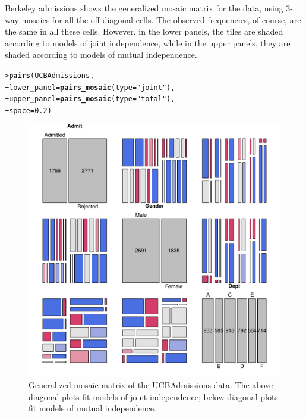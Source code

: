 \documentclass[10pt,krantz2]{krantz}\usepackage[]{graphicx}\usepackage[]{color}
\makeatletter
\newcommand{\hlnum}[1]{\textcolor[rgb]{0.686,0.059,0.569}{#1}}%
\newcommand{\hlstr}[1]{\textcolor[rgb]{0.192,0.494,0.8}{#1}}%
\newcommand{\hlstd}[1]{\textcolor[rgb]{0.345,0.345,0.345}{#1}}%
\newcommand{\hlkwc}[1]{\textcolor[rgb]{0.333,0.667,0.333}{#1}}%
\newcommand{\hlkwd}[1]{\textcolor[rgb]{0.737,0.353,0.396}{\textbf{#1}}}%
\newenvironment{kframe}{%
 \def\at@end@of@kframe{}%
 \ifinner\ifhmode%
  \def\at@end@of@kframe{\end{minipage}}%
  \begin{minipage}{\columnwidth}%
 \fi\fi%
 \def\FrameCommand##1{\hskip\@totalleftmargin \hskip-\fboxsep
 \colorbox{shadecolor}{##1}\hskip-\fboxsep
     \hskip-\linewidth \hskip-\@totalleftmargin \hskip\columnwidth}%
 \MakeFramed {\advance\hsize-\width
   \@totalleftmargin\z@ \linewidth\hsize
   \@setminipage}}%
 {\par\unskip\endMakeFramed%
 \at@end@of@kframe}
\newenvironment{knitrout}{}{} %
\renewenvironment{knitrout}{\small\renewcommand{\baselinestretch}{.85}}{} %
\makeatother
\begin{document}
\begin{Example}[berkeley4b]{Berkeley admissions}
 shows the generalized mosaic matrix for the 
data, using 3-way mosaics for all the off-diagonal cells.
The observed frequencies, of course, are the same in all these cells.
However, in the lower panels, the tiles are shaded according to models of
joint independence, while in the upper panels, they are shaded according to
models of mutual independence.
\begin{knitrout}
\color{fgcolor}\begin{kframe}
\begin{alltt}
\hlstd{> }\hlkwd{pairs}\hlstd{(UCBAdmissions,}
\hlstd{+ }      \hlkwc{lower_panel} \hlstd{=} \hlkwd{pairs_mosaic}\hlstd{(}\hlkwc{type} \hlstd{=} \hlstr{"joint"}\hlstd{),}
\hlstd{+ }      \hlkwc{upper_panel} \hlstd{=} \hlkwd{pairs_mosaic}\hlstd{(}\hlkwc{type} \hlstd{=} \hlstr{"total"}\hlstd{),}
\hlstd{+ }      \hlkwc{space}\hlstd{=}\hlnum{0.2}\hlstd{)}
\end{alltt}
\end{kframe}\begin{figure}[!htb]

\centerline{\includegraphics[width=.8\textwidth]{ch05/fig/berk-pairs2-1} }

\caption[Generalized mosaic matrix of the UCBAdmissions data]{Generalized mosaic matrix of the UCBAdmissions data. The above-diagonal plots fit models of joint independence; below-diagonal plots fit models of mutual independence.\label{fig:berk-pairs2}}
\end{figure}



\end{knitrout}
\end{Example}
\end{document}
